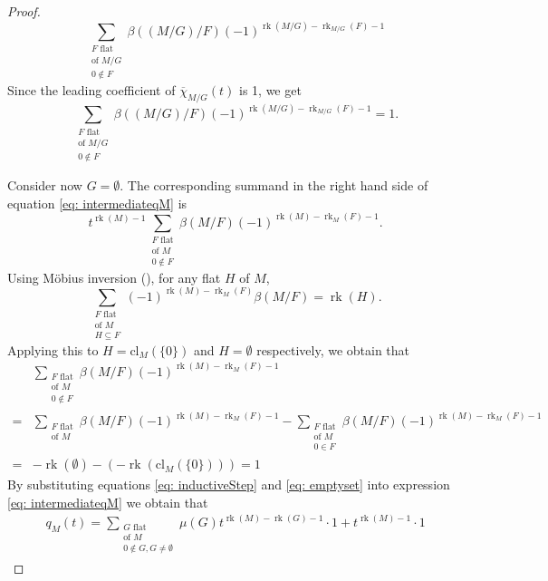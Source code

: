 \documentclass[12pt,a4paper,english]{scrartcl}
\DeclareMathOperator{\rank}{rk}
\begin{document}
\begin{proof}
\[
\sum_{\substack{F \text{ flat} \\ \text{of } M/G  \\ 0\notin F}}\beta((M/G)/F)(-1)^{\rank(M/G)-\rank_{M/G}(F)-1}
\]
Since the leading coefficient of $ \overline{\chi}_{M/G}(t)$ is 1, we get
\begin{equation}\label{eq: inductiveStep}
\sum_{\substack{F \text{ flat} \\ \text{of } M/G \\ 0\notin F}}\beta((M/G)/F)(-1)^{\rank(M/G)-\rank_{M/G}(F)-1} = 1.
\end{equation}

Consider now $G = \emptyset$. The corresponding summand in the right hand side of equation \eqref{eq: intermediateqM} is
\[
t^{\rank(M)-1} \sum_{\substack{F \text{ flat} \\ \text{of } M  \\ 0\notin F}}\beta(M/F)(-1)^{\rank(M)-\rank_{M}(F)-1}.
\]
Using Möbius inversion (\cite[Section 7.3]{WhiteCombGeo1987}), for any flat $H$ of $M$,
\[
\sum_{\substack{F \text{ flat} \\ \text{of } M  \\ H\subseteq F}} (-1)^{\rank(M)-\rank_M(F)} \beta(M/F) = \rank(H).
\]
Applying this to $H=\text{cl}_M(\{0\})$ and $H = \emptyset$ respectively, we obtain that 
\begin{equation}\label{eq: emptyset}
    \begin{split}
    &\sum_{\substack{F \text{ flat} \\ \text{of } M  \\ 0\notin F}}\beta(M/F)(-1)^{\rank(M)-\rank_{M}(F)-1}
    \\
    =&\sum_{\substack{F \text{ flat} \\ \text{of } M }}\beta(M/F)(-1)^{\rank(M)-\rank_{M}(F)-1}
    -
    \sum_{\substack{F \text{ flat} \\ \text{of } M  \\ 0\in F}}\beta(M/F)(-1)^{\rank(M)-\rank_{M}(F)-1}
    \\= 
    &-\rank(\emptyset)-(-\rank(\text{cl}_M(\{0\}))) 
    = 1
    \end{split}
\end{equation}
By substituting equations \eqref{eq: inductiveStep} and \eqref{eq: emptyset} into expression \eqref{eq: intermediateqM} we obtain that
\begin{align}\label{eq: intermediateqM2}
q_M(t) = \sum_{\substack{G \text{ flat} \\ \text{of } M \\ 0 \notin G,G\neq \emptyset}} \mu(G) t^{\rank(M) - \rank(G) - 1} \cdot 1 + t^{\rank(M)-1} \cdot 1
\end{align}


\end{proof}
\end{document}
